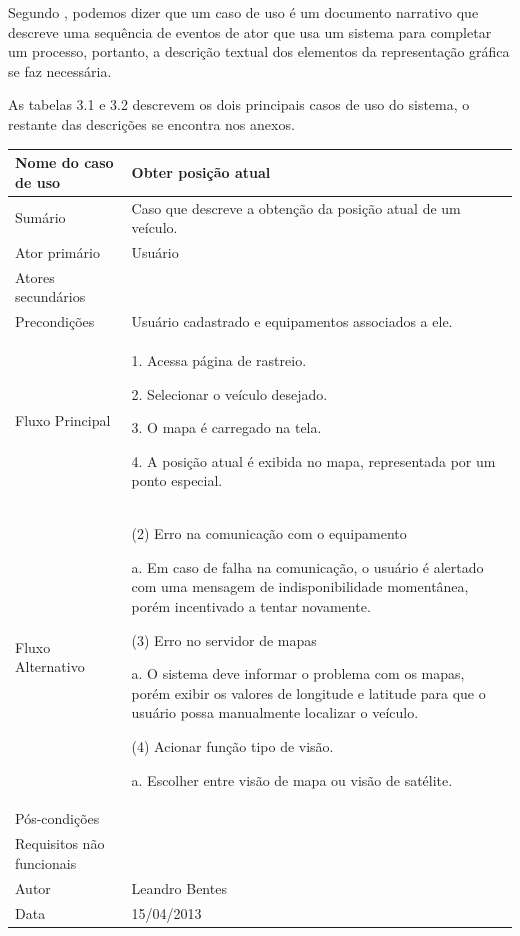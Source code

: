 Segundo \textcite{jacobson:2005}, podemos dizer que um caso de uso é um documento narrativo que descreve uma sequência de eventos de ator que usa um sistema para completar um processo, portanto, a descrição textual dos elementos da representação gráfica se faz necessária.

As tabelas 3.1 e 3.2 descrevem os dois principais casos de uso do sistema, o restante das descrições se encontra nos anexos.

\begin{flushleft}
\tablefirsthead{}
\tablehead{}
\tabletail{}
\tablelasttail{}
\begin{supertabular}{|m{5.5680003cm}|m{9.325cm}|}
\hline
Nome do caso de uso &
Obter posição atual\\\hline
Sumário &
Caso que descreve a obtenção da posição atual de um veículo. \\\hline
Ator primário &
Usuário\\\hline
Atores secundários &
~
\\\hline
Precondições &
Usuário cadastrado e equipamentos associados a ele. \\\hline
Fluxo Principal &
1. Acessa página de rastreio.

2. Selecionar o veículo desejado.

3. O mapa é carregado na tela.

4. A posição atual é exibida no mapa, representada por um ponto especial.\\\hline
Fluxo Alternativo &
(2) Erro na comunicação com o equipamento

a. Em caso de falha na comunicação, o usuário é alertado com uma mensagem de indisponibilidade momentânea, porém incentivado a tentar novamente.

(3) Erro no servidor de mapas

a. O sistema deve informar o problema com os mapas, porém exibir os valores de longitude e latitude para que o usuário possa manualmente localizar o veículo.

(4) Acionar função tipo de visão.

a. Escolher entre visão de mapa ou visão de satélite.\\\hline
Pós-condições &
~
\\\hline
Requisitos não funcionais &
~\\\hline
Autor &
Leandro Bentes\\\hline
Data &
15/04/2013\\\hline
\end{supertabular}
\end{flushleft}

